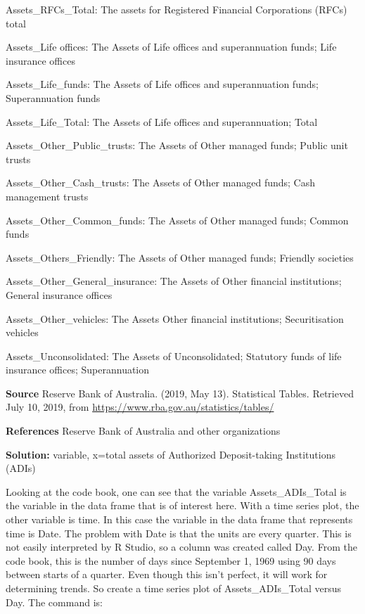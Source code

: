 \documentclass[
]{book}
\begin{document}
Assets\_RFCs\_Total: The assets for Registered Financial Corporations (RFCs) total

Assets\_Life offices: The Assets of Life offices and superannuation funds; Life insurance offices

Assets\_Life\_funds: The Assets of Life offices and superannuation funds; Superannuation funds

Assets\_Life\_Total: The Assets of Life offices and superannuation; Total

Assets\_Other\_Public\_trusts: The Assets of Other managed funds; Public unit trusts

Assets\_Other\_Cash\_trusts: The Assets of Other managed funds; Cash management trusts

Assets\_Other\_Common\_funds: The Assets of Other managed funds; Common funds

Assets\_Others\_Friendly: The Assets of Other managed funds; Friendly societies

Assets\_Other\_General\_insurance: The Assets of Other financial institutions; General insurance offices

Assets\_Other\_vehicles: The Assets Other financial institutions; Securitisation vehicles

Assets\_Unconsolidated: The Assets of Unconsolidated; Statutory funds of life insurance offices; Superannuation

\textbf{Source}
Reserve Bank of Australia. (2019, May 13). Statistical Tables. Retrieved July 10, 2019, from \url{https://www.rba.gov.au/statistics/tables/}

\textbf{References}
Reserve Bank of Australia and other organizations

\textbf{Solution:}
variable, x=total assets of Authorized Deposit-taking Institutions (ADIs)

Looking at the code book, one can see that the variable Assets\_ADIs\_Total is the variable in the data frame that is of interest here. With a time series plot, the other variable is time. In this case the variable in the data frame that represents time is Date. The problem with Date is that the units are every quarter. This is not easily interpreted by R Studio, so a column was created called Day. From the code book, this is the number of days since September 1, 1969 using 90 days between starts of a quarter. Even though this isn't perfect, it will work for determining trends. So create a time series plot of Assets\_ADIs\_Total versus Day. The command is:
\end{document}
